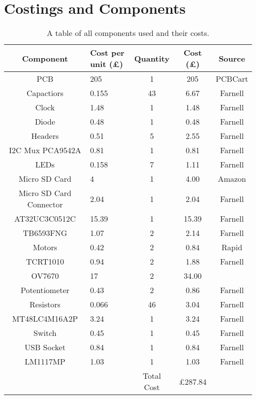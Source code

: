 \chapter{Costings and Components} \label{Appendix:Costings}

\begin{table}
\centering
\caption{A table of all components used and their costs.}
\label{table:Costings}
\begin{tabular}{|c|p{2cm}|c|c|c|} \hline
Component	&	Cost per unit (\pounds)	& Quantity 	&	Cost (\pounds)		&	Source		\\ \hline
PCB			&	205						&	1		&	205					&	PCBCart		\\
Capactiors	&	0.155 					& 	43		& 	6.67 				& 	Farnell 	\\
Clock 		& 	1.48					& 	1		&	1.48 				& 	Farnell		\\
Diode		&	0.48					&	1		&	0.48				&	Farnell 	\\
Headers		&	0.51 					&	5		&	2.55				&	Farnell 	\\
I2C Mux PCA9542A &	0.81				&	1		&	0.81				&	Farnell		\\
LEDs 		&	0.158					&	7		& 	1.11 				&	Farnell		\\
Micro SD Card &	4						&	1		&	4.00 				&	Amazon 		\\
Micro SD Card Connector & 2.04			&	1		&	2.04				&	Farnell		\\
AT32UC3C0512C	&15.39					&	1		&	15.39				&	Farnell		\\
TB6593FNG 	&	1.07 					&	2 		&	2.14 				&	Farnell 	\\
Motors  	&	0.42					&	2		&	0.84				&	Rapid 		\\
TCRT1010	& 	0.94 					&	2		&	1.88 				&	Farnell 	\\
OV7670		&	17						&	2		&	34.00				& 				\\
Potentiometer	&	0.43				&	2		&	0.86				&	Farnell 	\\
Resistors	&	0.066 					& 	46		&	3.04 				&	Farnell 	\\
MT48LC4M16A2P	& 3.24  				& 	1		&	3.24 				&	Farnell		\\
Switch		&	0.45					&	1		&	0.45				&	Farnell 	\\
USB Socket	&	0.84 					&	1		& 	0.84 				&	Farnell 	\\
LM1117MP	&	1.03					&	1		&	1.03	 			&	Farnell		\\ \hline \cline{3-4}
\multicolumn{2}{c|}{ }					& Total Cost  & \pounds 287.84		&	\multicolumn{1}{|c}{ }			\\ \cline{3-4}
\end{tabular}
\end{table}


